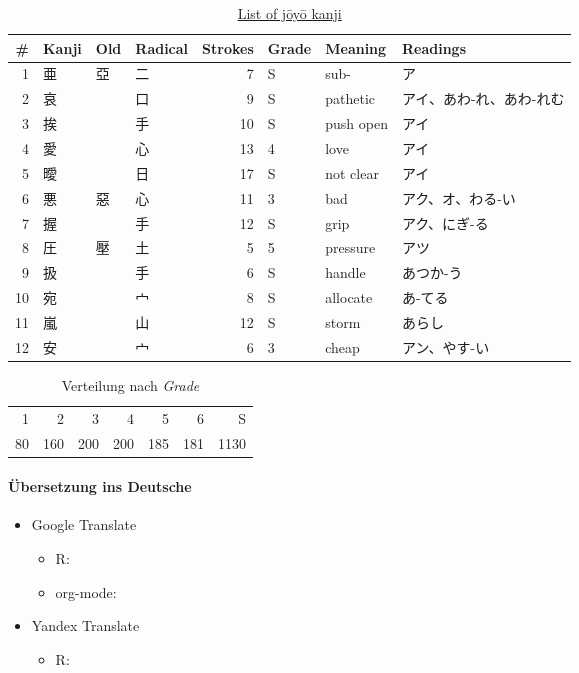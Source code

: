 \documentclass[justified, a4paper, notitlepage, captions=tableheading, nobib]{tufte-handout}
\begin{document}
\begin{table}[htbp]
\caption{\label{tab:org32e0d41}
\href{https://en.wikipedia.org/wiki/List\_of\_jōyō\_kanji}{List of jōyō kanji}}
\centering
\begin{tabular}{rlllrlll}
\toprule
\# & Kanji & Old & Radical & Strokes & Grade & Meaning & Readings\\
\midrule
1 & 亜 & 亞 & 二 & 7 & S & sub- & ア\\
2 & 哀 &  & 口 & 9 & S & pathetic & アイ、あわ-れ、あわ-れむ\\
3 & 挨 &  & 手 & 10 & S & push open & アイ\\
4 & 愛 &  & 心 & 13 & 4 & love & アイ\\
5 & 曖 &  & 日 & 17 & S & not clear & アイ\\
6 & 悪 & 惡 & 心 & 11 & 3 & bad & アク、オ、わる-い\\
7 & 握 &  & 手 & 12 & S & grip & アク、にぎ-る\\
8 & 圧 & 壓 & 土 & 5 & 5 & pressure & アツ\\
9 & 扱 &  & 手 & 6 & S & handle & あつか-う\\
10 & 宛 &  & 宀 & 8 & S & allocate & あ-てる\\
11 & 嵐 &  & 山 & 12 & S & storm & あらし\\
12 & 安 &  & 宀 & 6 & 3 & cheap & アン、やす-い\\
\bottomrule
\end{tabular}
\end{table}

\begin{table}[htbp]
\caption{Verteilung nach \emph{Grade}}
\centering
\begin{tabular}{rrrrrrr}
\toprule
1 & 2 & 3 & 4 & 5 & 6 & S\\
80 & 160 & 200 & 200 & 185 & 181 & 1130\\
\bottomrule
\end{tabular}
\end{table}

\paragraph{Übersetzung ins Deutsche}
\label{sec:orgc23f783}

\begin{itemize}
\item Google Translate
\begin{itemize}
\item R:
\item org-mode:
\end{itemize}
\item Yandex Translate
\begin{itemize}
\item R:
\end{itemize}
\end{itemize}
\end{document}
